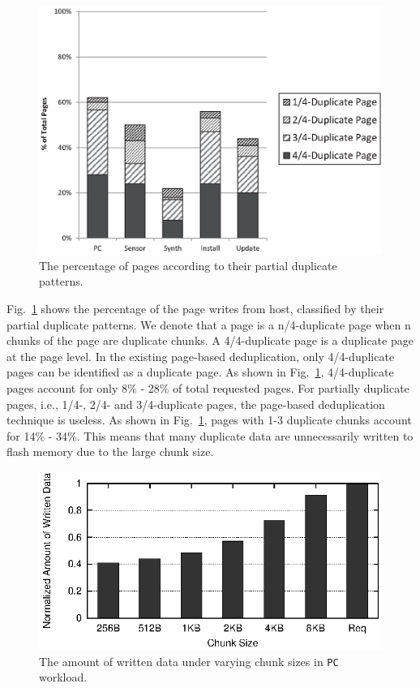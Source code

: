 \begin{figure}[t]
	\center
	\includegraphics[scale=0.5]{figure/finededup/dupChunkperReq}
	\caption{The percentage of pages according to their partial duplicate patterns.} %
	\label{fig:percentage}
\end{figure}

Fig.~\ref{fig:percentage} shows the percentage of the page writes from host, classified by their partial duplicate patterns.
We denote that a page is a n/4-duplicate page when n chunks of the page are duplicate chunks.
A 4/4-duplicate page is a duplicate page at the page level.
In the existing page-based deduplication, only 4/4-duplicate pages can be identified as a duplicate page.
As shown in Fig.~\ref{fig:percentage}, 4/4-duplicate pages account for only 8\% - 28\% of total requested pages.
For partially duplicate pages, i.e., 1/4-, 2/4- and 3/4-duplicate pages, the page-based deduplication technique is useless.
As shown in Fig.~\ref{fig:percentage},
pages with 1-3 duplicate chunks account for 14\% - 34\%.
This means that many duplicate data are unnecessarily written to flash memory
due to the large chunk size.

\begin{figure}[t]
	\center
	\includegraphics[scale=1]{figure/finededup/nonDuplicatedData_ChunkSize}
	\caption{The amount of written data under varying chunk sizes in \texttt{PC} workload.} %
	\label{fig:chunksize}
\end{figure}

